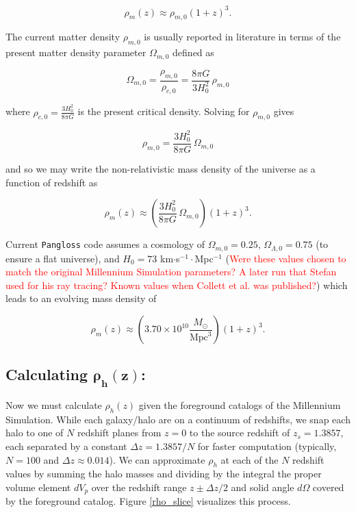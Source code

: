 \documentclass[12pt]{article}
\begin{document}
\begin{equation}\label{mass_evol}
\rho_m(z)\approx\rho_{m,0}(1+z)^3.
\end{equation}

The current matter density $\rho_{m,0}$ is usually reported in literature in terms of the present matter density parameter $\Omega_{m,0}$ defined as

\begin{equation}\label{}
\Omega_{m,0}=\frac{\rho_{m,0}}{\rho_{c,0}}=\frac{8\pi G}{3H_0^2}\,\rho_{m,0}
\end{equation}

where $\rho_{c,0}=\frac{3H_0^2}{8\pi G}$ is the present critical density. Solving for $\rho_{m,0}$ gives

\begin{equation*}\label{}
\rho_{m,0}=\frac{3H_0^2}{8\pi G}\,\Omega_{m,0}
\end{equation*}

and so we may write the non-relativistic mass density of the universe as a function of redshift as

\begin{equation}\label{rho}
\rho_m(z)\approx\left(\frac{3H_0^2}{8\pi G}\,\Omega_{m,0}\right)(1+z)^3.
\end{equation}

Current \texttt{Pangloss} code assumes a cosmology of $\Omega_{m,0}=0.25$, $\Omega_{\Lambda,0}=0.75$ (to ensure a flat universe), and $H_0=73$ km$\cdot$s$^{-1}\cdot$Mpc$^{-1}$ (\textcolor{red}{Were these values chosen to match the original Millennium Simulation parameters? A later run that Stefan used for his ray tracing? Known values when Collett et al. was published?}) which leads to an evolving mass density of

\begin{equation}\label{rho}
\rho_m(z)\approx\left(3.70\times10^{10}\frac{M_{\odot}}{\text{Mpc}^3}\right)(1+z)^3.
\end{equation}

\subsection*{Calculating $\bm{\rho_h(z)}$:}

Now we must calculate $\rho_h(z)$ given the foreground catalogs of the Millennium Simulation. While each galaxy/halo are on a continuum of redshifts, we snap each halo to one of $N$ redshift planes from $z=0$ to the source redshift of $z_s=1.3857$, each separated by a constant $\Delta z=1.3857/N$ for faster computation (typically, $N=100$ and $\Delta z\approx0.014$). We can approximate $\rho_h$ at each of the $N$ redshift values by summing the halo masses and dividing by the integral the proper volume element $dV_p$ over the redshift range $z\pm \Delta z/2$ and solid angle $d\Omega$ covered by the foreground catalog. Figure \ref{rho_slice} visualizes this process.\\
\end{document}
